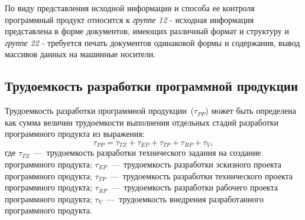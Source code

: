     По виду представления исходной информации и способа ее контроля программный продукт относится к \textit{группе 12} - исходная информация представлена в форме документов, имеющих различный формат и структуру и \textit{группе 22} - требуется печать документов одинаковой формы и содержания, вывод массивов данных на машинные носители.

    \subsection{Трудоемкость разработки программной продукции}
    \label{subsec:trud}
        Трудоемкость разработки программной продукции~($\tau_{PP}$) может быть определена как сумма величин трудоемкости выполнения отдельных стадий разработки программного продукта из выражения:
        \begin{equation}
            \tau_{PP} = \tau_{TZ} + \tau_{EP} + \tau_{TP} + \tau_{RP} + \tau_{V},
        \end{equation}
        где $\tau_{TZ}$~---~трудоемкость разработки технического задания на создание программного продукта;
        $\tau_{EP}$~---~трудоемкость разработки эскизного проекта программного продукта;
        $\tau_{TP}$~---~трудоемкость разработки технического проекта программного продукта;
        $\tau_{RP}$~---~трудоемкость разработки рабочего проекта программного продукта;
        $\tau_{V}$~---~трудоемкость внедрения разработанного программного продукта.

